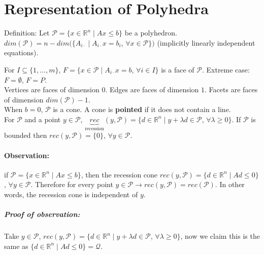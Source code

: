 \documentclass[main]{subfiles}
\begin{document}

\section{Representation of Polyhedra}
Definition: Let $\mathcal{P} = \{x \in \mathbb{R}^n \mid Ax \leq b\}$ be a 
polyhedron. $dim(\mathcal{P}) = n - dim(\{A_{i\cdot} \mid A_{i\cdot}x = b_i$, $
\forall x \in \mathcal{P} \})$ (implicitly linearly independent equations).

For $I \subseteq \{1, \dots, m\}$, $F = \{ x \in \mathcal{P} \mid A_{i\cdot} x = 
b$, $\forall i \in I \}$ is a face of $\mathcal{P}$.
Extreme case: $F = \emptyset$, $F = P$.\\

Vertices are faces of dimension $0$. Edges are faces of dimension $1$. Facets 
are faces of dimension $dim(\mathcal{P})-1$.\\

When $b = 0$, $\mathcal{P}$ is a cone. A cone is \textbf{pointed} if it does not 
contain a line.\\

For $\mathcal{P}$ and a point $y \in \mathcal{P}$, $\underbrace{rec}
_{\text{recession}}(y, \mathcal{P}) = \{ d \in \mathbb{R}^n \mid y + \lambda d 
\in \mathcal{P}$, $\forall \lambda \geq 0 \}$. If $\mathcal{P}$ is bounded then 
$rec(y, \mathcal{P}) = \{ 0 \}$, $\forall y \in \mathcal{P}$. \\

\paragraph{Observation:}
if $\mathcal{P} = \{x \in \mathbb{R}^n \mid Ax \leq b \}$, then the recession
cone $rec(y, \mathcal{P}) = \{d \in \mathbb{R}^n \mid Ad \leq 0 \}$, $\forall y
\in \mathcal{P}$. Therefore for every point $y \in \mathcal{P} \rightarrow
rec(y, \mathcal{P}) = rec(\mathcal{P})$. In other words, the recession cone is
independent of $y$.

\subparagraph{Proof of observation:}
Take $y \in \mathcal{P}$, $rec(y, \mathcal{P}) = \{d \in \mathbb{R}^n \mid y +
\lambda d \in \mathcal{P}$, $\forall \lambda \geq 0 \}$, now we claim this is
the same as $\{d \in \mathbb{R}^n \mid Ad \leq 0 \} = \mathcal{Q}$.\\
\end{document}
